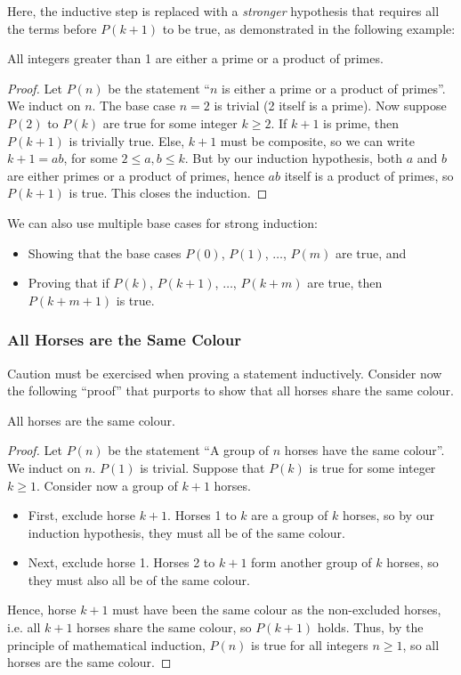 Here, the inductive step is replaced with a \emph{stronger} hypothesis that requires all the terms before $P(k+1)$ to be true, as demonstrated in the following example:

\begin{statement}
    All integers greater than 1 are either a prime or a product of primes.
\end{statement}
\begin{proof}
    Let $P(n)$ be the statement ``$n$ is either a prime or a product of primes''. We induct on $n$. The base case $n = 2$ is trivial (2 itself is a prime). Now suppose $P(2)$ to $P(k)$ are true for some integer $k \geq 2$. If $k+1$ is prime, then $P(k+1)$ is trivially true. Else, $k+1$ must be composite, so we can write $k+1 = ab$, for some $2 \leq a, b \leq k$. But by our induction hypothesis, both $a$ and $b$ are either primes or a product of primes, hence $ab$ itself is a product of primes, so $P(k+1)$ is true. This closes the induction.
\end{proof}

We can also use multiple base cases for strong induction:

\begin{itemize}
    \item Showing that the base cases $P(0)$, $P(1)$, $\dots$, $P(m)$ are true, and
    \item Proving that if $P(k)$, $P(k+1)$, $\dots$, $P(k+m)$ are true, then $P(k+m+1)$ is true.
\end{itemize}

\subsubsection{All Horses are the Same Colour}

Caution must be exercised when proving a statement inductively. Consider now the following ``proof'' that purports to show that all horses share the same colour.

\begin{statement}
    All horses are the same colour.
\end{statement}
\begin{proof}
    Let $P(n)$ be the statement ``A group of $n$ horses have the same colour''. We induct on $n$. $P(1)$ is trivial. Suppose that $P(k)$ is true for some integer $k \geq 1$. Consider now a group of $k+1$ horses.
    \begin{itemize}
        \item First, exclude horse $k+1$. Horses 1 to $k$ are a group of $k$ horses, so by our induction hypothesis, they must all be of the same colour.
        \item Next, exclude horse 1. Horses 2 to $k+1$ form another group of $k$ horses, so they must also all be of the same colour.
    \end{itemize}
    Hence, horse $k+1$ must have been the same colour as the non-excluded horses, i.e. all $k+1$ horses share the same colour, so $P(k+1)$ holds. Thus, by the principle of mathematical induction, $P(n)$ is true for all integers $n \geq 1$, so all horses are the same colour.
\end{proof}

